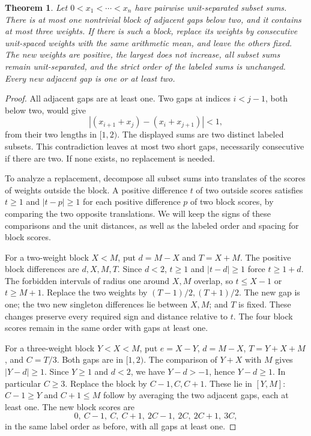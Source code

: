 \documentclass[10pt,letterpaper]{article}
\newtheorem{theorem}{Theorem}
\begin{document}
\begin{theorem}\label{normal}
Let \(0<x_1<\cdots<x_n\) have pairwise unit-separated subset sums.
There is at most one nontrivial block of adjacent gaps below two,
and it contains at most three weights. If there is such a block,
replace its weights by consecutive unit-spaced weights with the same
arithmetic mean, and leave the others fixed. The new weights
are positive, the largest does not increase, all subset sums
remain unit-separated, and the strict order of the labeled sums
is unchanged. Every new adjacent gap is one or at least two.
\end{theorem}
\begin{proof}
All adjacent gaps are at least one. Two gaps at indices
\(i<j-1\), both below two, would give
\[
 \left|(x_{i+1}+x_j)-(x_i+x_{j+1})\right|<1,
\]
from their two lengths in \([1,2)\). The displayed sums are
two distinct labeled subsets. This contradiction leaves at most
two short gaps, necessarily consecutive if there are two. If none
exists, no replacement is needed.

To analyze a replacement, decompose all subset sums into translates
of the scores of weights outside the block. A positive difference
\(t\) of two outside scores satisfies \(t\ge1\) and
\(|t-p|\ge1\) for each positive difference \(p\) of two block
scores, by comparing the two opposite translations. We will
keep the signs of these comparisons and the unit distances,
as well as the labeled order and spacing for block scores.

For a two-weight block \(X<M\), put \(d=M-X\) and \(T=X+M\).
The positive block differences are \(d,X,M,T\).
Since \(d<2\), \(t\ge1\) and \(|t-d|\ge1\) force
\(t\ge1+d\). The forbidden intervals of radius one around
\(X,M\) overlap, so \(t\le X-1\) or \(t\ge M+1\).
Replace the two weights by \((T-1)/2,(T+1)/2\).
The new gap is one; the two new singleton differences lie
between \(X,M\); and \(T\) is fixed. These changes preserve
every required sign and distance relative to \(t\).
The four block scores remain in the same order with gaps
at least one.

For a three-weight block \(Y<X<M\), put \(e=X-Y\),
\(d=M-X\), \(T=Y+X+M\), and \(C=T/3\).
Both gaps are in \([1,2)\).
The comparison of \(Y+X\) with \(M\) gives \(|Y-d|\ge1\).
Since \(Y\ge1\) and \(d<2\), we have \(Y-d>-1\), hence
\(Y-d\ge1\). In particular \(C\ge3\).
Replace the block by \(C-1,C,C+1\). These lie in \([Y,M]\):
\(C-1\ge Y\) and \(C+1\le M\) follow by averaging the two
adjacent gaps, each at least one. The new block scores are
\[
 0,\ C-1,\ C,\ C+1,\ 2C-1,\ 2C,\ 2C+1,\ 3C,
\]
in the same label order as before, with all gaps at least one.


\end{proof}
\end{document}
